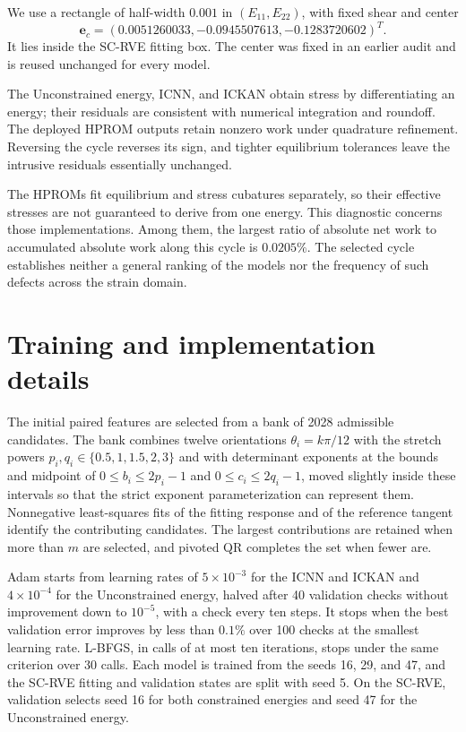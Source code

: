 \documentclass[10pt,a4paper]{article}
\newcommand{\ee}{\bm e}
\begin{document}
We use a rectangle of half-width $0.001$ in $(E_{11},E_{22})$, with fixed shear and center
\[
 \ee_c=(0.0051260033,-0.0945507613,-0.1283720602)^T.
\]
It lies inside the SC-RVE fitting box. The center was fixed in an earlier audit and is reused unchanged for every model.

\begin{table}[htbp]
 \centering\small
 \caption{Net work around the counterclockwise SC-RVE cycle, in J m$^{-3}$.}
 \label{tab:cycle}
 
\end{table}

The Unconstrained energy, ICNN, and ICKAN obtain stress by differentiating an energy; their residuals are consistent with numerical integration and roundoff. The deployed HPROM outputs retain nonzero work under quadrature refinement. Reversing the cycle reverses its sign, and tighter equilibrium tolerances leave the intrusive residuals essentially unchanged.

The HPROMs fit equilibrium and stress cubatures separately, so their effective stresses are not guaranteed to derive from one energy. This diagnostic concerns those implementations. Among them, the largest ratio of absolute net work to accumulated absolute work along this cycle is $0.0205\%$. The selected cycle establishes neither a general ranking of the models nor the frequency of such defects across the strain domain.

\section{Training and implementation details}
\label{sec:supp_training}
The initial paired features are selected from a bank of 2028 admissible candidates. The bank combines twelve orientations $\theta_i=k\pi/12$ with the stretch powers $p_i,q_i\in\{0.5,1,1.5,2,3\}$ and with determinant exponents at the bounds and midpoint of $0\leq b_i\leq2p_i-1$ and $0\leq c_i\leq2q_i-1$, moved slightly inside these intervals so that the strict exponent parameterization can represent them. Nonnegative least-squares fits of the fitting response and of the reference tangent identify the contributing candidates. The largest contributions are retained when more than $m$ are selected, and pivoted QR completes the set when fewer are.

Adam starts from learning rates of $5\times10^{-3}$ for the ICNN and ICKAN and $4\times10^{-4}$ for the Unconstrained energy, halved after 40 validation checks without improvement down to $10^{-5}$, with a check every ten steps. It stops when the best validation error improves by less than $0.1\%$ over 100 checks at the smallest learning rate. L-BFGS, in calls of at most ten iterations, stops under the same criterion over 30 calls. Each model is trained from the seeds 16, 29, and 47, and the SC-RVE fitting and validation states are split with seed 5. On the SC-RVE, validation selects seed 16 for both constrained energies and seed 47 for the Unconstrained energy.
\end{document}
